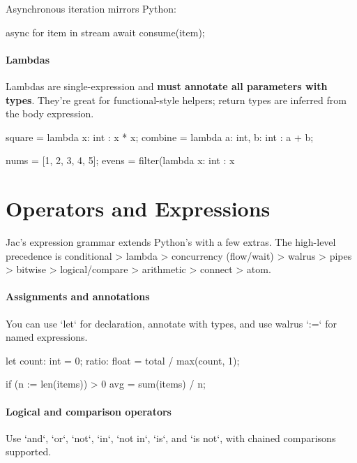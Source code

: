 Asynchronous iteration mirrors Python:

\begin{jacblock}
async for item in stream {
    await consume(item);
}
\end{jacblock}

\paragraph{Lambdas}

Lambdas are single-expression and \textbf{must annotate all parameters with types}. They’re great for functional-style helpers; return types are inferred from the body expression.

\begin{jacblock}
square = lambda x: int : x * x;
combine = lambda a: int, b: int : a + b;

nums = [1, 2, 3, 4, 5];
evens = filter(lambda x: int : x %
\end{jacblock}

\section{Operators and Expressions}

Jac's expression grammar extends Python's with a few extras. The high-level precedence is conditional > lambda > concurrency (flow/wait) > walrus > pipes > bitwise > logical/compare > arithmetic > connect > atom.

\paragraph{Assignments and annotations}

You can use `let` for declaration, annotate with types, and use walrus `:=` for named expressions.

\begin{jacblock}
let count: int = 0;
ratio: float = total / max(count, 1);

if (n := len(items)) > 0 {
    avg = sum(items) / n;
}
\end{jacblock}

\paragraph{Logical and comparison operators}

Use `and`, `or`, `not`, `in`, `not in`, `is`, and `is not`, with chained comparisons supported.

